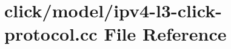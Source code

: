 \hypertarget{ipv4-l3-click-protocol_8cc}{}\section{click/model/ipv4-\/l3-\/click-\/protocol.cc File Reference}
\label{ipv4-l3-click-protocol_8cc}
